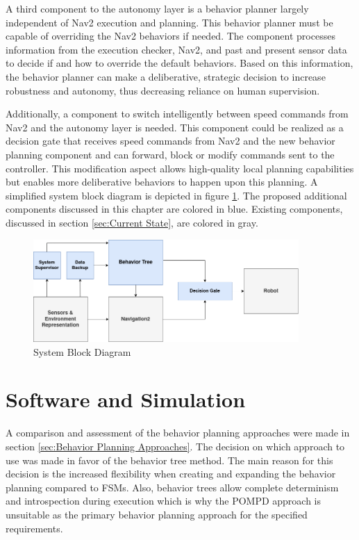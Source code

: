 A third component to the autonomy layer is a behavior planner largely independent of Nav2 execution and planning. This behavior planner must be capable of overriding the Nav2 behaviors if needed. The component processes information from the execution checker, Nav2, and past and present sensor data to decide if and how to override the default behaviors. Based on this information, the behavior planner can make a deliberative, strategic decision to increase robustness and autonomy, thus decreasing reliance on human supervision.

Additionally, a component to switch intelligently between speed commands from Nav2 and the autonomy layer is needed. This component could be realized as a decision gate that receives speed commands from Nav2 and the new behavior planning component and can forward, block or modify commands sent to the controller. This modification aspect allows high-quality local planning capabilities but enables more deliberative behaviors to happen upon this planning. A simplified system block diagram is depicted in figure \ref{fig:block_diagram}. The proposed additional components discussed in this chapter are colored in blue. Existing components, discussed in section \ref{sec:Current State}, are colored in gray. 

\begin{figure}[ht]
	\centering 
	\includegraphics[width=0.9\textwidth]{images/block_diagram.png}
	\caption{System Block Diagram}
	\label{fig:block_diagram}
\end{figure}


\section{Software and Simulation}

A comparison and assessment of the behavior planning approaches were made in section \ref{sec:Behavior Planning Approaches}. The decision on which approach to use was made in favor of the behavior tree method. The main reason for this decision is the increased flexibility when creating and expanding the behavior planning compared to FSMs. Also, behavior trees allow complete determinism and introspection during execution which is why the POMPD approach is unsuitable as the primary behavior planning approach for the specified requirements. 

